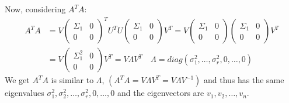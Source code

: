 \documentclass[a4paper, 12pt]{article}
\begin{document}
Now, considering $A^TA$:
\[ 
    \begin{aligned}
        A^TA &= V \begin{pmatrix} \Sigma_1 & 0 \\ 0 & 0 \end{pmatrix}^T U^T U\begin{pmatrix} \Sigma_1 & 0 \\ 0 & 0 \end{pmatrix} V^T = V \begin{pmatrix} \Sigma_1 & 0 \\ 0 & 0 \end{pmatrix} \begin{pmatrix} \Sigma_1 & 0 \\ 0 & 0 \end{pmatrix} V^T\\
        &= V \begin{pmatrix} \Sigma_1^2 & 0 \\ 0 & 0 \end{pmatrix}V^T = V\Lambda V^T \quad \Lambda = diag(\sigma_1^2, \ldots, \sigma_r^2, 0, \ldots, 0)
    \end{aligned}
\]
We get $A^TA$ is similar to $\Lambda$, $(A^TA = V\Lambda V^T = V \Lambda V^{-1})$ and
thus has the same eigenvalues $\sigma_1^2, \sigma_2^2, \ldots, \sigma_r^2, 0, \ldots, 0$ and the eigenvectors are $v_1, v_2, \ldots, v_n$.
\end{document}
